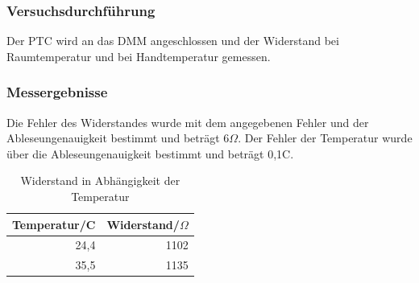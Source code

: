 \documentclass[12pt,a4paper]{article}
\begin{document}
\subsubsection*{Versuchsdurchführung}

Der PTC wird an das DMM angeschlossen und der Widerstand bei Raumtemperatur und bei Handtemperatur gemessen.

\subsubsection*{Messergebnisse}

Die Fehler des Widerstandes wurde mit dem angegebenen Fehler und der Ableseungenauigkeit bestimmt und beträgt 6$\Omega$. Der Fehler der Temperatur wurde über die Ableseungenauigkeit bestimmt und beträgt 0,1C.

\begin{table}[H]
\begin{center}
\begin{tabular}{|r|r|}
\hline
\multicolumn{1}{|l|}{Temperatur/C} & \multicolumn{1}{l|}{Widerstand/$\Omega$} \\ \hline
24,4 & 1102 \\ \hline
35,5 & 1135 \\ \hline
\end{tabular}
\end{center}
\caption{Widerstand in Abhängigkeit der Temperatur}
\label{tab:2_1}
\end{table}
\end{document}
